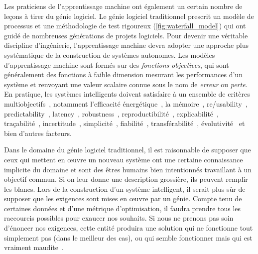 Les praticiens de l'apprentissage machine ont également un certain nombre de leçons à tirer du génie logiciel. Le génie logiciel traditionnel prescrit un modèle de processus et une méthodologie de test rigoureux (\autoref{fig:waterfall_model}) qui ont guidé de nombreuses générations de projets logiciels. Pour devenir une véritable discipline d'ingénierie, l'apprentissage machine devra adopter une approche plus systématique de la construction de systèmes autonomes. Les modèles d'apprentissage machine sont formés sur des \textit{fonctions-objectives}, qui sont généralement des fonctions à faible dimension mesurant les performances d'un système et renvoyant une valeur scalaire connue sous le nom de \textit{erreur} ou \textit{perte}. En pratique, les systèmes intelligents doivent satisfaire à un ensemble de critères multiobjectifs~\citep{censi2015mathématiques}, notamment l'efficacité énergétique~\citep{paull2010novel}, la mémoire~\citep{memory2013mitliagkas}, re/usability~\citep{breuleux2017automatic,deleu2019torchmeta}, predictability~\citep{turner2017well}, latency~\citep{ravanelli2018twin}, robustness~\citep{pineau2003policy}, reproductibilité~\citep{pineau2019improving}, explicabilité~\citep{turner2016model}, traçabilité~\citep{guo2017semantically, tsirigotis2018orion}, incertitude~\citep{diaz2018interactive}, simplicité~\citep{kastner2019representation}, fiabilité~\citep{xu2017efficient}, transférabilité~\citep{mehta2019active}, évolutivité~\citep{luan2019break} et bien d'autres facteurs.

Dans le domaine du génie logiciel traditionnel, il est raisonnable de supposer que ceux qui mettent en œuvre un nouveau système ont une certaine connaissance implicite du domaine et sont des êtres humains bien intentionnés travaillant à un objectif commun. Si on leur donne une description grossière, ils peuvent remplir les blancs. Lors de la construction d'un système intelligent, il serait plus sûr de supposer que les exigences sont mises en œuvre par un génie. Compte tenu de certaines données et d'une métrique d'optimisation, il faudra prendre tous les raccourcis possibles pour exaucer nos souhaits. Si nous ne prenons pas soin d'énoncer nos exigences, cette entité produira une solution qui ne fonctionne tout simplement pas (dans le meilleur des cas), ou qui semble fonctionner mais qui est vraiment maudite~\citep{bellman1957dynamic}.

